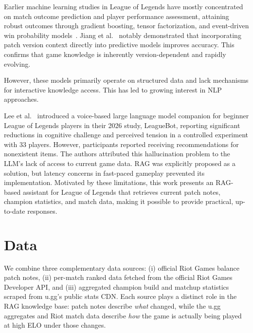 \documentclass[fleqn,moreauthors,10pt]{ds_report}
\begin{document}
Earlier machine learning studies in League of Legends have mostly concentrated on match outcome prediction and player performance assessment, attaining robust outcomes through gradient boosting, tensor factorization, and event-driven win probability models~\cite{ferreira2025quantifying, maymin2021smart, costa2021feature}. Jiang et al.~\cite{jiang2020individualized} notably demonstrated that incorporating patch version context directly into predictive models improves accuracy. This confirms that game knowledge is inherently version-dependent and rapidly evolving.

However, these models primarily operate on structured data and lack mechanisms for interactive knowledge access. This has led to growing interest in NLP approaches.

Lee et al.~\cite{lee2026leaguebot} introduced a voice-based large language model companion for beginner League of Legends players in their 2026 study, LeagueBot, reporting significant reductions in cognitive challenge and perceived tension in a controlled experiment with 33 players. However, participants reported receiving recommendations for nonexistent items. The authors attributed this hallucination problem to the LLM's lack of access to current game data. RAG was explicitly proposed as a solution, but latency concerns in fast-paced gameplay prevented its implementation. Motivated by these limitations, this work presents an RAG-based assistant for League of Legends that retrieves current patch notes, champion statistics, and match data, making it possible to provide practical, up-to-date responses.


\section*{Data}

    We combine three complementary data sources: (i) official Riot Games balance patch notes, (ii) per-match ranked data fetched from the official Riot Games Developer API\cite{riotApi}, and (iii) aggregated champion build and matchup statistics scraped from u.gg's public stats CDN. Each source plays a distinct role in the RAG knowledge base: patch notes describe \emph{what} changed, while the u.gg aggregates and Riot match data describe \emph{how} the game is actually being played at high ELO under those changes. 
\end{document}
